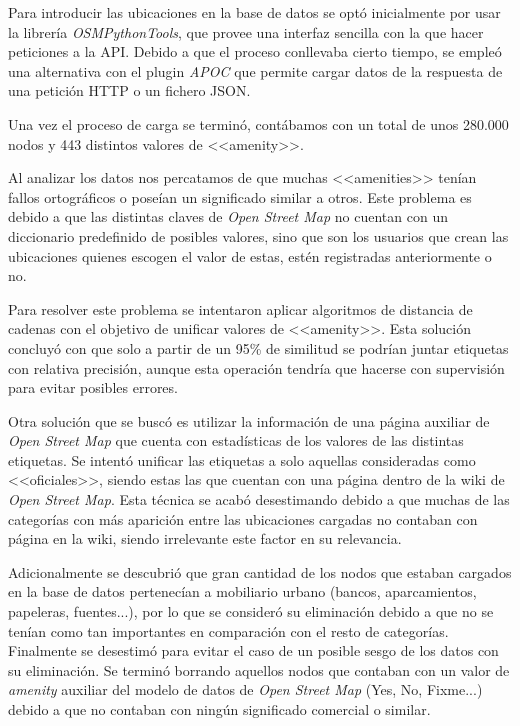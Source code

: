 Para introducir las ubicaciones en la base de datos se optó inicialmente por usar la librería \textit{OSMPythonTools}, que provee una interfaz sencilla con la que hacer peticiones a la API. Debido a que el proceso conllevaba cierto tiempo, se empleó una alternativa con el plugin \textit{APOC} que permite cargar datos de la respuesta de una petición HTTP o un fichero JSON.

Una vez el proceso de carga se terminó, contábamos con un total de unos 280.000 nodos y 443 distintos valores de <<amenity>>. 

Al analizar los datos nos percatamos de que muchas <<amenities>> tenían fallos ortográficos o poseían un significado similar a otros. Este problema es debido a que las distintas claves de \textit{Open Street Map} no cuentan con un diccionario predefinido de posibles valores, sino que son los usuarios que crean las ubicaciones quienes escogen el valor de estas, estén registradas anteriormente o no.

Para resolver este problema se intentaron aplicar algoritmos de distancia de cadenas con el objetivo de unificar valores de <<amenity>>. Esta solución concluyó con que solo a partir de un 95\% de similitud se podrían juntar etiquetas con relativa precisión, aunque esta operación tendría que hacerse con supervisión para evitar posibles errores.

Otra solución que se buscó es utilizar la información de una página auxiliar de \textit{Open Street Map} que cuenta con estadísticas de los valores de las distintas etiquetas. Se intentó unificar las etiquetas a solo aquellas consideradas como <<oficiales>>, siendo estas las que cuentan con una página dentro de la wiki de \textit{Open Street Map}. Esta técnica se acabó desestimando debido a que muchas de las categorías con más aparición entre las ubicaciones cargadas no contaban con página en la wiki, siendo irrelevante este factor en su relevancia.

Adicionalmente se descubrió que gran cantidad de los nodos que estaban cargados en la base de datos pertenecían a mobiliario urbano (bancos, aparcamientos, papeleras, fuentes...), por lo que se consideró su eliminación debido a que no se tenían como tan importantes en comparación con el resto de categorías. Finalmente se desestimó para evitar el caso de un posible sesgo de los datos con su eliminación. Se terminó borrando aquellos nodos que contaban con un valor de \textit{amenity} auxiliar del modelo de datos de \textit{Open Street Map} (Yes, No, Fixme...) debido a que no contaban con ningún significado comercial o similar.


